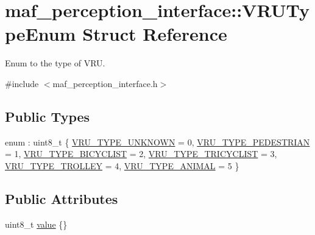 \hypertarget{structmaf__perception__interface_1_1VRUTypeEnum}{}\section{maf\+\_\+perception\+\_\+interface\+:\+:V\+R\+U\+Type\+Enum Struct Reference}
\label{structmaf__perception__interface_1_1VRUTypeEnum}


Enum to the type of V\+RU.  




{\ttfamily \#include $<$maf\+\_\+perception\+\_\+interface.\+h$>$}

\subsection*{Public Types}
\begin{DoxyCompactItemize}
\item 
enum \+: uint8\+\_\+t \{ \newline
\hyperlink{structmaf__perception__interface_1_1VRUTypeEnum_aee3fe9654eb49327174c1b6ef761becfac5da4acef5c7e744f0b9a20738b52069}{V\+R\+U\+\_\+\+T\+Y\+P\+E\+\_\+\+U\+N\+K\+N\+O\+WN} = 0, 
\hyperlink{structmaf__perception__interface_1_1VRUTypeEnum_aee3fe9654eb49327174c1b6ef761becfaa12161b6e206e85eeac6c7694ccfafe0}{V\+R\+U\+\_\+\+T\+Y\+P\+E\+\_\+\+P\+E\+D\+E\+S\+T\+R\+I\+AN} = 1, 
\hyperlink{structmaf__perception__interface_1_1VRUTypeEnum_aee3fe9654eb49327174c1b6ef761becfae3e7c9b33642801bf1c97910ba44df58}{V\+R\+U\+\_\+\+T\+Y\+P\+E\+\_\+\+B\+I\+C\+Y\+C\+L\+I\+ST} = 2, 
\hyperlink{structmaf__perception__interface_1_1VRUTypeEnum_aee3fe9654eb49327174c1b6ef761becfac8a8e5f31b3fc55e98c24587bdc43fa5}{V\+R\+U\+\_\+\+T\+Y\+P\+E\+\_\+\+T\+R\+I\+C\+Y\+C\+L\+I\+ST} = 3, 
\newline
\hyperlink{structmaf__perception__interface_1_1VRUTypeEnum_aee3fe9654eb49327174c1b6ef761becfab5bbc5e3c8903bd1768771ed37d5f76b}{V\+R\+U\+\_\+\+T\+Y\+P\+E\+\_\+\+T\+R\+O\+L\+L\+EY} = 4, 
\hyperlink{structmaf__perception__interface_1_1VRUTypeEnum_aee3fe9654eb49327174c1b6ef761becfa562cf9ee7e95b9c5af73a5b999eca539}{V\+R\+U\+\_\+\+T\+Y\+P\+E\+\_\+\+A\+N\+I\+M\+AL} = 5
 \}
\end{DoxyCompactItemize}
\subsection*{Public Attributes}
\begin{DoxyCompactItemize}
\item 
uint8\+\_\+t \hyperlink{structmaf__perception__interface_1_1VRUTypeEnum_a996353676859d128e696cc1c3bb65d11}{value} \{\}
\end{DoxyCompactItemize}


